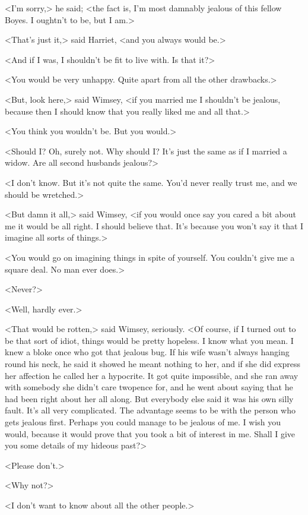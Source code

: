 <I'm sorry,> he said; <the fact is, I'm most damnably jealous of this fellow Boyes. I oughtn't to be, but I am.>

<That's just it,> said Harriet, <and you always would be.>

<And if I was, I shouldn't be fit to live with. Is that it?>

<You would be very unhappy. Quite apart from all the other drawbacks.>

<But, look here,> said Wimsey, <if you married me I shouldn't be jealous, because then I should know that you really liked me and all that.>

<You think you wouldn't be. But you would.>

<Should I? Oh, surely not. Why should I? It's just the same as if I married a widow. Are all second husbands jealous?>

<I don't know. But it's not quite the same. You'd never really trust me, and we should be wretched.>

<But damn it all,> said Wimsey, <if you would once say you cared a bit about me it would be all right. I should believe that. It's because you won't say it that I imagine all sorts of things.>

<You would go on imagining things in spite of yourself. You couldn't give me a square deal. No man ever does.>

<Never?>

<Well, hardly ever.>

<That would be rotten,> said Wimsey, seriously. <Of course, if I turned out to be that sort of idiot, things would be pretty hopeless. I know what you mean. I knew a bloke once who got that jealous bug. If his wife wasn't always hanging round his neck, he said it showed he meant nothing to her, and if she did express her affection he called her a hypocrite. It got quite impossible, and she ran away with somebody she didn't care twopence for, and he went about saying that he had been right about her all along. But everybody else said it was his own silly fault. It's all very complicated. The advantage seems to be with the person who gets jealous first. Perhaps you could manage to be jealous of me. I wish you would, because it would prove that you took a bit of interest in me. Shall I give you some details of my hideous past?>

<Please don't.>

<Why not?>

<I don't want to know about all the other people.>


